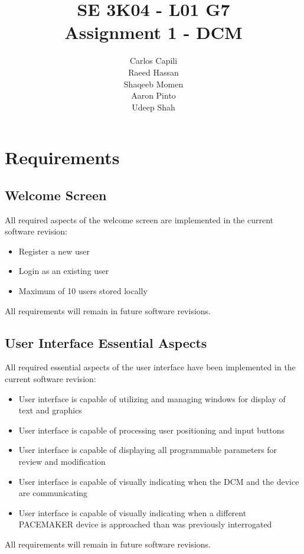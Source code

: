 \documentclass[12pt]{article}
\title{SE 3K04 - L01 G7 \\ Assignment 1 - DCM}
\author{
    Carlos Capili \\
    Raeed Hassan \\
    Shaqeeb Momen \\
    Aaron Pinto \\
    Udeep Shah
}
\date{}
\begin{document}
\maketitle \newpage
\tableofcontents \newpage

\section{Requirements}

\subsection{Welcome Screen}
All required aspects of the welcome screen are implemented in the current software revision:
\begin{itemize}
    \item Register a new user
    \item Login as an existing user
    \item Maximum of 10 users stored locally
\end{itemize}
All requirements will remain in future software revisions.

\subsection{User Interface Essential Aspects}
All required essential aspects of the user interface have been implemented in the current software revision:
\begin{itemize}
    \item User interface is capable of utilizing and managing windows for display of text and graphics
    \item User interface is capable of processing user positioning and input buttons
    \item User interface is capable of displaying all programmable parameters for review and modification
    \item User interface is capable of visually indicating when the DCM and the device are communicating
    \item User interface is capable of visually indicating when a different PACEMAKER device is approached than was previously interrogated
\end{itemize}
All requirements will remain in future software revisions.
\end{document}
